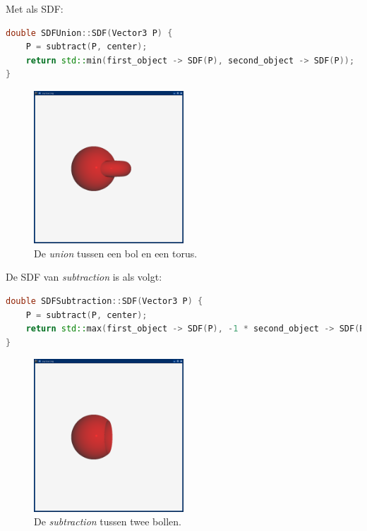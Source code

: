 \documentclass[12pt, a4paper]{article}
\begin{document}
Met als SDF:

\begin{lstlisting}[language=C++]
double SDFUnion::SDF(Vector3 P) {
    P = subtract(P, center);
    return std::min(first_object -> SDF(P), second_object -> SDF(P));
}
\end{lstlisting}


\begin{figure}[H]
    \centering
    \includegraphics[width=0.50\textwidth]{renders/union.png}
    \caption{De \emph{union} tussen een bol en een torus.}
    \label{fig:union}
\end{figure}

De SDF van \emph{subtraction} is als volgt:

\begin{lstlisting}[language=C++]
double SDFSubtraction::SDF(Vector3 P) {
    P = subtract(P, center);
    return std::max(first_object -> SDF(P), -1 * second_object -> SDF(P));
}
\end{lstlisting}


\begin{figure}[H]
    \centering
    \includegraphics[width=0.50\textwidth]{renders/subtraction.png}
    \caption{De \emph{subtraction} tussen twee bollen.}
    \label{fig:subtraction}
\end{figure}
\end{document}
